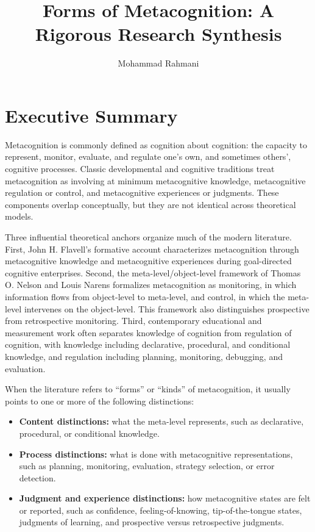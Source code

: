 \documentclass[a4paper]{article}
\title{Forms of Metacognition: A Rigorous Research Synthesis}
\date{}
\author{Mohammad Rahmani}
\begin{document}
   \maketitle

   \section{Executive Summary}

   Metacognition is commonly defined as cognition about cognition: the capacity to represent, monitor, evaluate, and regulate one's own, and sometimes others', cognitive processes. Classic developmental and cognitive traditions treat metacognition as involving at minimum metacognitive knowledge, metacognitive regulation or control, and metacognitive experiences or judgments. These components overlap conceptually, but they are not identical across theoretical models.

   Three influential theoretical anchors organize much of the modern literature. First, John H. Flavell's formative account characterizes metacognition through metacognitive knowledge and metacognitive experiences during goal-directed cognitive enterprises. Second, the meta-level/object-level framework of Thomas O. Nelson and Louis Narens formalizes metacognition as monitoring, in which information flows from object-level to meta-level, and control, in which the meta-level intervenes on the object-level. This framework also distinguishes prospective from retrospective monitoring. Third, contemporary educational and measurement work often separates knowledge of cognition from regulation of cognition, with knowledge including declarative, procedural, and conditional knowledge, and regulation including planning, monitoring, debugging, and evaluation.

   When the literature refers to ``forms'' or ``kinds'' of metacognition, it usually points to one or more of the following distinctions:

   \begin{itemize}
      \item \textbf{Content distinctions:} what the meta-level represents, such as declarative, procedural, or conditional knowledge.
      \item \textbf{Process distinctions:} what is done with metacognitive representations, such as planning, monitoring, evaluation, strategy selection, or error detection.
      \item \textbf{Judgment and experience distinctions:} how metacognitive states are felt or reported, such as confidence, feeling-of-knowing, tip-of-the-tongue states, judgments of learning, and prospective versus retrospective judgments.
   \end{itemize}
\end{document}
